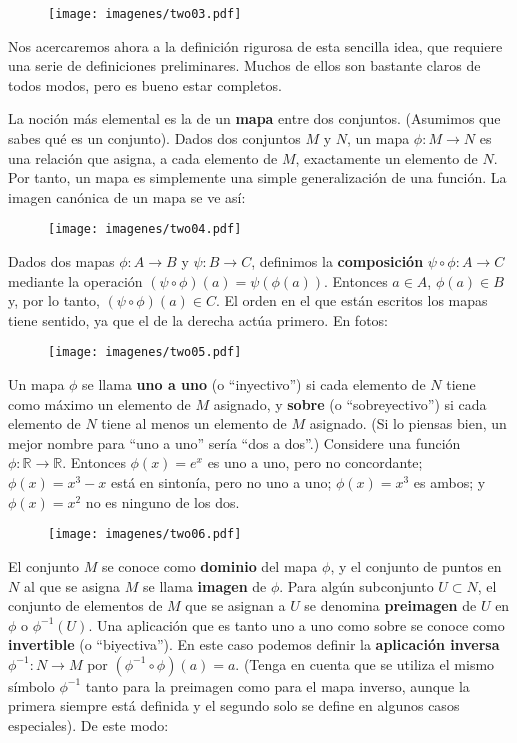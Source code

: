 \documentclass[11pt,b5paper,openany,twoside]{book}
\begin{document}
\begin{figure}[h]
\centering
\texttt{[image: imagenes/two03.pdf]}
\end{figure}

Nos acercaremos ahora a la definición rigurosa de esta sencilla idea, que requiere una serie de definiciones preliminares.
Muchos de ellos son bastante claros de todos modos, pero es bueno estar completos.

La noción más elemental es la de un {\bf mapa} entre dos conjuntos.
(Asumimos que sabes qué es un conjunto).
Dados dos conjuntos $M$ y $N$, un mapa $\phi: M\rightarrow N$ es una relación que asigna, a cada elemento de $M$, exactamente un elemento de $N$.
Por tanto, un mapa es simplemente una simple generalización de una función.
La imagen canónica de un mapa se ve así:

\begin{figure}[h]
\centering
\texttt{[image: imagenes/two04.pdf]}
\end{figure}

Dados dos mapas $\phi: A\rightarrow B$ y $\psi:B\rightarrow C$, definimos la {\bf composición} $\psi\circ\phi: A\rightarrow C$ mediante la operación $(\psi\circ\phi)(a)=\psi(\phi(a))$.
Entonces $a\in A$, $\phi(a)\in B$ y, por lo tanto, $(\psi\circ\phi)(a)\in C$.
El orden en el que están escritos los mapas tiene sentido, ya que el de la derecha actúa primero.
En fotos:

\begin{figure}[h]
\centering
\texttt{[image: imagenes/two05.pdf]}
\end{figure}

Un mapa $\phi$ se llama {\bf uno a uno} (o ``inyectivo'') si cada elemento de $N$ tiene como máximo un elemento de $M$ asignado, y {\bf sobre} (o ``sobreyectivo'') si cada elemento de $N$ tiene al menos un elemento de $M$ asignado.
(Si lo piensas bien, un mejor nombre para ``uno a uno'' sería ``dos a dos''.)
Considere una función $\phi: \mathbb{R}\rightarrow\mathbb{R}$.
Entonces $\phi(x)=e^x$ es uno a uno, pero no concordante; $\phi(x)=x^3-x$ está en sintonía, pero no uno a uno; $\phi(x)=x^3$ es ambos; y $\phi(x)=x^2$ no es ninguno de los dos.

\begin{figure}[h]
\centering
\texttt{[image: imagenes/two06.pdf]}
\end{figure}

El conjunto $M$ se conoce como {\bf dominio} del mapa $\phi$, y el conjunto de puntos en $N$ al que se asigna $M$ se llama {\bf imagen} de $\phi$.
Para algún subconjunto $U\subset N$, el conjunto de elementos de $M$ que se asignan a $U$ se denomina {\bf preimagen} de $U$ en $\phi$ o $\phi^{-1}(U)$.
Una aplicación que es tanto uno a uno como sobre se conoce como {\bf invertible} (o ``biyectiva'').
En este caso podemos definir la {\bf aplicación inversa} $\phi^{-1}:N\rightarrow M$ por $(\phi^{-1}\circ\phi)(a)=a$.
(Tenga en cuenta que se utiliza el mismo símbolo $\phi^{-1}$ tanto para la preimagen como para el mapa inverso, aunque la primera siempre está definida y el segundo solo se define en algunos casos especiales).
De este modo:
\end{document}
